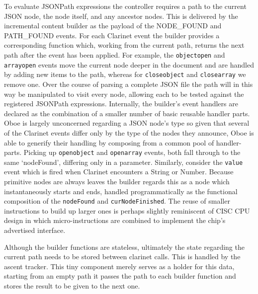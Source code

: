 \documentclass[]{article}
\begin{document}
To evaluate JSONPath expressions the controller requires a path to the
current JSON node, the node itself, and any ancestor nodes. This is
delivered by the incremental content builder as the payload of the
NODE\_FOUND and PATH\_FOUND events. For each Clarinet event the builder
provides a corresponding function which, working from the current path,
returns the next path after the event has been applied. For example, the
\texttt{objectopen} and \texttt{arrayopen} events move the current node
deeper in the document and are handled by adding new items to the path,
whereas for \texttt{closeobject} and \texttt{closearray} we remove one.
Over the course of parsing a complete JSON file the path will in this
way be manipulated to visit every node, allowing each to be tested
against the registered JSONPath expressions. Internally, the builder's
event handlers are declared as the combination of a smaller number of
basic reusable handler parts. Oboe is largely unconcerned regarding a
JSON node's type so given that several of the Clarinet events differ
only by the type of the nodes they announce, Oboe is able to generify
their handling by composing from a common pool of handler-parts. Picking
up \texttt{openobject} and \texttt{openarray} events, both fall through
to the same `nodeFound', differing only in a parameter. Similarly,
consider the \texttt{value} event which is fired when Clarinet
encounters a String or Number. Because primitive nodes are always leaves
the builder regards this as a node which instantaneously starts and
ends, handled programmatically as the functional composition of the
\texttt{nodeFound} and \texttt{curNodeFinished}. The reuse of smaller
instructions to build up larger ones is perhaps slightly reminiscent of
CISC CPU design in which micro-instructions are combined to implement
the chip's advertised interface.

Although the builder functions are stateless, ultimately the state
regarding the current path needs to be stored between clarinet calls.
This is handled by the ascent tracker. This tiny component merely serves
as a holder for this data, starting from an empty path it passes the
path to each builder function and stores the result to be given to the
next one.
\end{document}
